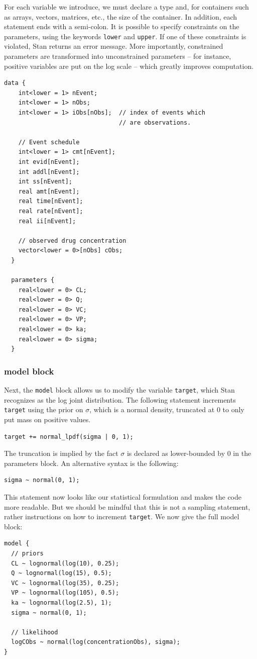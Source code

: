 For each variable we introduce, we must declare a type and, for containers such as arrays, vectors, matrices, etc., the size of the container.
In addition, each statement ends with a semi-colon.
It is possible to specify constraints on the parameters, using the keywords \texttt{lower} and \texttt{upper}.
If one of these constraints is violated, Stan returns an error message.
More importantly, constrained parameters are transformed into unconstrained parameters -- for instance, positive variables are put on the log scale -- which greatly improves computation.

\begin{lstlisting}[style=stan, numbers=none] 
  data {
    int<lower = 1> nEvent;
    int<lower = 1> nObs;
    int<lower = 1> iObs[nObs];  // index of events which
                                // are observations.

    // Event schedule
    int<lower = 1> cmt[nEvent];
    int evid[nEvent];
    int addl[nEvent];
    int ss[nEvent];
    real amt[nEvent];
    real time[nEvent];
    real rate[nEvent];
    real ii[nEvent];

    // observed drug concentration
    vector<lower = 0>[nObs] cObs;
  }
  
  parameters {
    real<lower = 0> CL;
    real<lower = 0> Q;
    real<lower = 0> VC;
    real<lower = 0> VP;
    real<lower = 0> ka;
    real<lower = 0> sigma;
  }
\end{lstlisting}

\subsubsection{model block}

Next, the \texttt{model} block allows us to modify the variable \texttt{target}, which Stan recognizes as the log joint distribution.
The following statement increments \texttt{target} using the prior on $\sigma$, which is a normal density, truncated at 0 to only put mass on positive values.
\begin{lstlisting}
target += normal_lpdf(sigma | 0, 1);
\end{lstlisting}
The truncation is implied by the fact $\sigma$ is declared as lower-bounded by 0 in the parameters block.
An alternative syntax is the following:
\begin{lstlisting}
sigma ~ normal(0, 1);
\end{lstlisting}
This statement now looks like our statistical formulation and makes the code more readable.
But we should be mindful that this is not a sampling statement, rather instructions on how to increment \texttt{target}.
We now give the full model block:
\begin{lstlisting}
model {
  // priors
  CL ~ lognormal(log(10), 0.25); 
  Q ~ lognormal(log(15), 0.5);
  VC ~ lognormal(log(35), 0.25);
  VP ~ lognormal(log(105), 0.5);
  ka ~ lognormal(log(2.5), 1);
  sigma ~ normal(0, 1);

  // likelihood
  logCObs ~ normal(log(concentrationObs), sigma);
}
\end{lstlisting}

